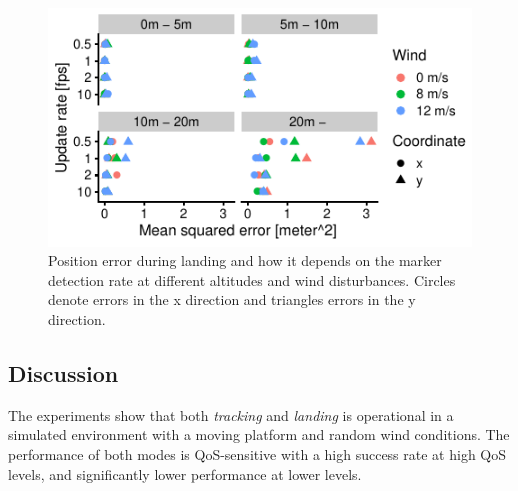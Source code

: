 \documentclass[conference]{IEEEtran}
\begin{document}
\begin{figure}[t]
\centering
\includegraphics[scale=0.9]{data_visualization/QoSLanding.pdf}
\caption{Position error during landing and how it depends 
on the marker detection rate at different altitudes and wind disturbances.
Circles denote errors in the x direction and triangles 
errors in the y direction.}
\label{fig:PositionErrorDuringLanding}
\end{figure}

\subsection{Discussion}

The experiments show that both \emph{tracking} and \emph{landing} 
is operational
in a simulated environment with a moving
platform and random wind conditions. The performance of both
modes is QoS-sensitive with a high success rate 
at high QoS levels, and significantly lower performance at lower 
levels.
\end{document}
